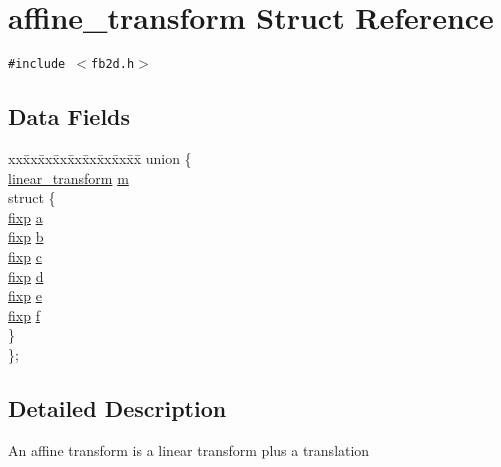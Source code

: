 \hypertarget{structaffine__transform}{
\section{affine\_\-transform Struct Reference}
\label{structaffine__transform}
}
{\tt \#include $<$fb2d.h$>$}

\subsection*{Data Fields}
\begin{CompactItemize}
\item 
\begin{tabbing}
xx\=xx\=xx\=xx\=xx\=xx\=xx\=xx\=xx\=\kill
union \{\\
\>\hyperlink{structlinear__transform}{linear\_transform} \hyperlink{structaffine__transform_88bca61da72f5df6dc7c1f36ce367dc6}{m}\\
\>struct \{\\
\>\>\hyperlink{screen_8h_19d2c966acde4ded69e29a7c6e5ba523}{fixp} \hyperlink{structaffine__transform_a942561b38eb7577dec7ae684349c585}{a}\\
\>\>\hyperlink{screen_8h_19d2c966acde4ded69e29a7c6e5ba523}{fixp} \hyperlink{structaffine__transform_b9024901df32465f83dc1dc2af732a43}{b}\\
\>\>\hyperlink{screen_8h_19d2c966acde4ded69e29a7c6e5ba523}{fixp} \hyperlink{structaffine__transform_f2e2b13b2149e2034abb5370990f6966}{c}\\
\>\>\hyperlink{screen_8h_19d2c966acde4ded69e29a7c6e5ba523}{fixp} \hyperlink{structaffine__transform_98fa7b7718a721dced6c045e6c3fd83b}{d}\\
\>\>\hyperlink{screen_8h_19d2c966acde4ded69e29a7c6e5ba523}{fixp} \hyperlink{structaffine__transform_9e5214673c53d4a7f5f9ac3083b00c69}{e}\\
\>\>\hyperlink{screen_8h_19d2c966acde4ded69e29a7c6e5ba523}{fixp} \hyperlink{structaffine__transform_4aa4aae576af9e45000031729455ffd2}{f}\\
\>\} \\
\}; \\

\end{tabbing}\end{CompactItemize}


\subsection{Detailed Description}
An affine transform is a linear transform plus a translation 

